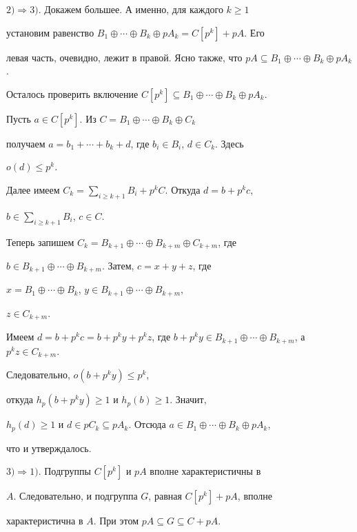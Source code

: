 \begin{pf}
$2)\Rightarrow 3)$. Докажем большее. А именно, для каждого $k\ge1$ 


установим равенство $B_1\oplus\dotsb\oplus B_k\oplus pA_k=C[p^k]+pA$. Его 


левая часть, очевидно, лежит в правой. Ясно также, что $pA\subseteq 


B_1\oplus\dotsb\oplus B_k\oplus pA_k$. 


Осталось проверить включение $C[p^k]\subseteq B_1\oplus\dotsb\oplus 


B_k\oplus pA_k$. 


Пусть $a\in C[p^k]$. Из $C=B_1\oplus\dotsb\oplus B_k\oplus C_k$ 


получаем $a=b_1+\dotsb+b_k+d$, где $b_i\in B_i$, $d\in C_k$. Здесь 


$o(d)\le p^k$. 


Далее имеем $C_k=\sum\limits_{i\ge k+1}B_i+p^k C$. Откуда $d=b+p^k c$, 


$b\in\sum\limits_{i\ge k+1}B_i$, $c\in C$. 


Теперь запишем $C_k=B_{k+1}\oplus\dotsb\oplus B_{k+m}\oplus C_{k+m}$, где 


$b\in B_{k+1}\oplus\dotsb\oplus B_{k+m}$. Затем, $c=x+y+z$, где 


$x=B_1\oplus\dotsb\oplus B_k$, $y\in B_{k+1}\oplus\dotsb\oplus B_{k+m}$, 


$z\in C_{k+m}$. 


Имеем $d=b+p^k c=b+p^k y+p^k z$, где $b+p^k y\in 


B_{k+1}\oplus\dotsb\oplus B_{k+m}$, а $p^k z\in C_{k+m}$. 


Следовательно, $o(b+p^k y)\le p^k$, 


откуда $h_p(b+p^k y)\ge1$ и $h_p(b)\ge1$. Значит, 


$h_p(d)\ge1$ и $d\in p C_k\subseteq pA_k$. Отсюда $a\in 


B_1\oplus\dotsb\oplus B_k\oplus pA_k$, 


что и утверждалось. 


 


$3)\Rightarrow 1)$. Подгруппы $C[p^k]$ и $pA$ вполне характеристичны в 


$A$. Следовательно, и подгруппа $G$, равная $C[p^k]+pA$, вполне 


характеристична в $A$. При этом $pA\subseteq G\subseteq C+pA$. 


\end{pf} 


